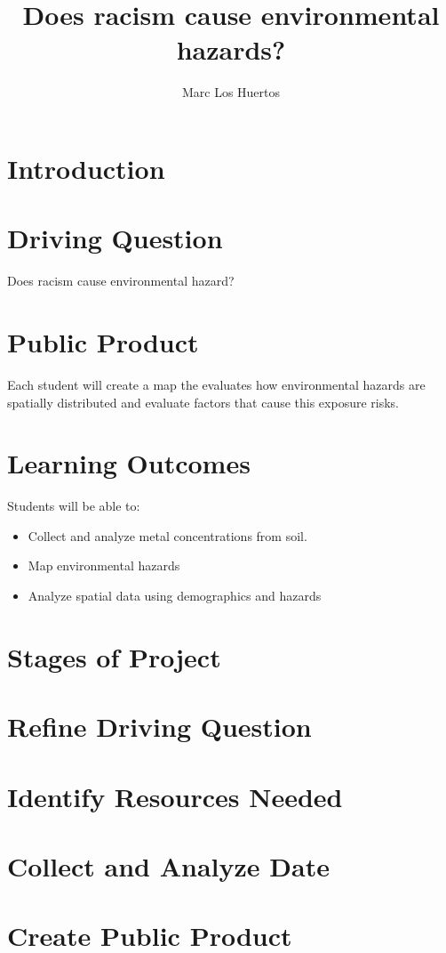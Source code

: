 \documentclass{article}
\author{Marc Los Huertos}
\title{Does racism cause environmental hazards?}
\begin{document}

\maketitle

\section{Introduction}

\section{Driving Question}

Does racism cause environmental hazard?

\section{Public Product}

Each student will create a map the evaluates how environmental hazards are spatially distributed and evaluate factors that cause this exposure risks.


\section{Learning Outcomes}

Students will be able to: 

\begin{itemize}
  \item Collect and analyze metal concentrations from soil.
  \item Map environmental hazards
  \item Analyze spatial data using demographics and hazards

\end{itemize}

\section{Stages of Project}

\section{Refine Driving Question}

\section{Identify Resources Needed}

\section{Collect and Analyze Date}

\section{Create Public Product}
\end{document}
